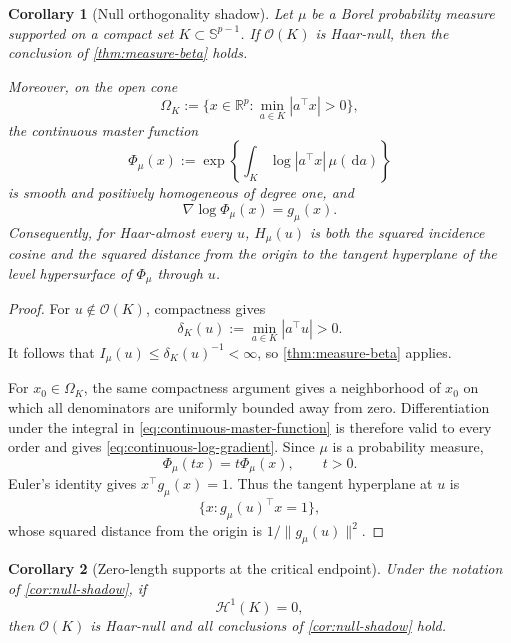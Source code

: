 \documentclass[11pt]{article}
\numberwithin{equation}{section}
\theoremstyle{thmstyleone}%
\newtheorem{corollary}[corollary]{Corollary}
\theoremstyle{thmstyletwo}%
\let\cref\autoref
\newcommand{\R}{\mathbb R}
\newcommand{\sphere}{\mathbb S}
\newcommand{\dd}{\,\mathrm d}
\begin{document}
\begin{corollary}[Null orthogonality shadow]
\label{cor:null-shadow}
Let \(\mu\) be a Borel probability measure supported on a compact set
\(K\subset\sphere^{p-1}\).  If \(\mathcal O(K)\) is Haar-null, then the
conclusion of \cref{thm:measure-beta} holds.

Moreover, on the open cone
\begin{equation}
  \Omega_K
  :=
  \{x\in\R^p:\min_{a\in K}|a^\top x|>0\},
  \label{eq:shadow-free-cone}
\end{equation}
the continuous master function
\begin{equation}
  \Phi_\mu(x)
  :=
  \exp\left\{
    \int_K\log|a^\top x|\,\mu(\dd a)
  \right\}
  \label{eq:continuous-master-function}
\end{equation}
is smooth and positively homogeneous of degree one, and
\begin{equation}
  \nabla\log\Phi_\mu(x)=g_\mu(x).
  \label{eq:continuous-log-gradient}
\end{equation}
Consequently, for Haar-almost every \(u\), \(H_\mu(u)\) is both the squared
incidence cosine and the squared distance from the origin to the tangent
hyperplane of the level hypersurface of \(\Phi_\mu\) through \(u\).
\end{corollary}

\begin{proof}
For \(u\notin\mathcal O(K)\), compactness gives
\[
  \delta_K(u):=\min_{a\in K}|a^\top u|>0.
\]
It follows that \(I_\mu(u)\leq\delta_K(u)^{-1}<\infty\), so
\cref{thm:measure-beta} applies.

For \(x_0\in\Omega_K\), the same compactness argument gives a neighborhood
of \(x_0\) on which all denominators are uniformly bounded away from zero.
Differentiation under the integral in
\cref{eq:continuous-master-function} is therefore valid to every order and
gives \cref{eq:continuous-log-gradient}.  Since \(\mu\) is a probability
measure,
\[
  \Phi_\mu(tx)=t\Phi_\mu(x),
  \qquad t>0.
\]
Euler's identity gives \(x^\top g_\mu(x)=1\).  Thus the tangent hyperplane at
\(u\) is
\[
  \{x:g_\mu(u)^\top x=1\},
\]
whose squared distance from the origin is \(1/\|g_\mu(u)\|^2\).
\end{proof}

\begin{corollary}[Zero-length supports at the critical endpoint]
\label{cor:subcritical-support}
Under the notation of \cref{cor:null-shadow}, if
\begin{equation}
  \mathcal H^1(K)=0,
  \label{eq:subcritical-support}
\end{equation}
then \(\mathcal O(K)\) is Haar-null and all conclusions of
\cref{cor:null-shadow} hold.
\end{corollary}
\end{document}
